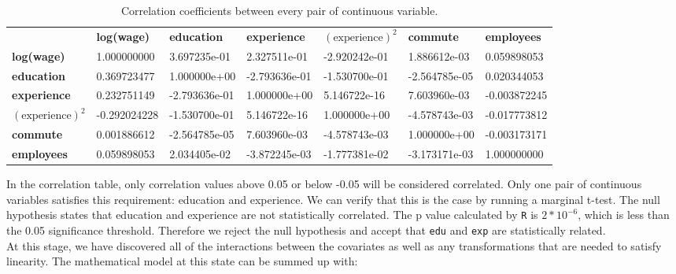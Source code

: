 \documentclass{article}
\begin{document}
      \begin{table}[H]
        \centering
        \begin{tabular}{lllllll}
                        &  \textbf{log(wage)}   &    \textbf{education}  &  \textbf{experience}   & \textbf{$(\text{experience})^2$} & \textbf{commute}       & \textbf{employees} \\
        \textbf{log(wage)}       &  1.000000000 &  3.697235e-01 &  2.327511e-01 & -2.920242e-01 & 1.886612e-03  &  0.059898053 \\
        \textbf{education}       &  0.369723477 &  1.000000e+00 & -2.793636e-01 & -1.530700e-01 & -2.564785e-05 &   0.020344053 \\
        \textbf{experience}      &  0.232751149 & -2.793636e-01 &  1.000000e+00 &  5.146722e-16 & 7.603960e-03  & -0.003872245 \\
        \textbf{$(\text{experience})^2$}  & -0.292024228 & -1.530700e-01 &  5.146722e-16 &  1.000000e+00 & -4.578743e-03 &  -0.017773812 \\
        \textbf{commute}         &  0.001886612 & -2.564785e-05 &  7.603960e-03 & -4.578743e-03 & 1.000000e+00  & -0.003173171 \\
        \textbf{employees}       &  0.059898053 &  2.034405e-02 & -3.872245e-03 & -1.777381e-02 & -3.173171e-03 &   1.000000000
        \end{tabular}
        \caption{Correlation coefficients between every pair of continuous variable.}
        \label{tab:correlated}
      \end{table}

      In the correlation table, only correlation values above 0.05 or below -0.05
      will be considered correlated. Only one pair of continuous variables satisfies
      this requirement: education and experience. We can verify that this is the
      case by running a marginal t-test. The null hypothesis states that education
      and experience are not statistically correlated. The p value calculated by \texttt{R}
      is $2 * 10^{-6}$, which is less than the 0.05 significance threshold. Therefore
      we reject the null hypothesis and accept that \texttt{edu} and \texttt{exp} are
      statistically related. \\

      At this stage, we have discovered all of the interactions between the covariates
      as well as any transformations that are needed to satisfy linearity. The
      mathematical model at this state can be summed up with:
\end{document}
